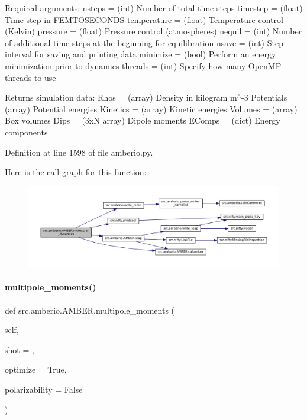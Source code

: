 Required arguments\+: nsteps = (int) Number of total time steps timestep = (float) Time step in F\+E\+M\+T\+O\+S\+E\+C\+O\+N\+DS temperature = (float) Temperature control (Kelvin) pressure = (float) Pressure control (atmospheres) nequil = (int) Number of additional time steps at the beginning for equilibration nsave = (int) Step interval for saving and printing data minimize = (bool) Perform an energy minimization prior to dynamics threads = (int) Specify how many Open\+MP threads to use

Returns simulation data\+: Rhos = (array) Density in kilogram m$^\wedge$-\/3 Potentials = (array) Potential energies Kinetics = (array) Kinetic energies Volumes = (array) Box volumes Dips = (3xN array) Dipole moments E\+Comps = (dict) Energy components 

Definition at line 1598 of file amberio.\+py.

Here is the call graph for this function\+:
\nopagebreak
\begin{figure}[H]
\begin{center}
\leavevmode
\includegraphics[width=350pt]{classsrc_1_1amberio_1_1AMBER_a8fa5737ac517637eeb8b53426eba46dd_cgraph}
\end{center}
\end{figure}
\mbox{\label{classsrc_1_1amberio_1_1AMBER_a9f9f42962721c5cf9b62f80eaffe58c1}} 
\paragraph{\texorpdfstring{multipole\+\_\+moments()}{multipole\_moments()}}
{\footnotesize\ttfamily def src.\+amberio.\+A\+M\+B\+E\+R.\+multipole\+\_\+moments (\begin{DoxyParamCaption}\item[{}]{self,  }\item[{}]{shot = {},  }\item[{}]{optimize = {\ttfamily True},  }\item[{}]{polarizability = {\ttfamily False} }\end{DoxyParamCaption})}



